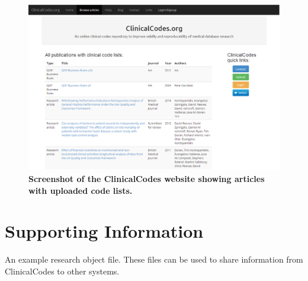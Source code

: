 \documentclass[10pt]{article}
\begin{document}
\begin{figure}[!ht]
\begin{center}
  \includegraphics[width=6in]{figure/clinicalcodes_screenshot.eps}
\end{center}
\caption{
    {\bf Screenshot of the ClinicalCodes website showing articles with uploaded code lists.}
}
\label{figure3_screenshot}
\end{figure}

\section*{Supporting Information}

An example research object file. These files can be used to share information from ClinicalCodes to other systems.
\end{document}
